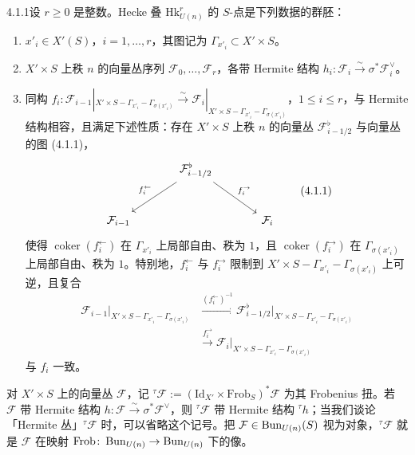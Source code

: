 \begin{defn}{4.1.1}设 $r\ge0$ 是整数。Hecke 叠 $\mathrm{Hk}^r_{U(n)}$ 的 $S$-点是下列数据的群胚：
\begin{enumerate}
\item $x'_i\in X'(S)$，$i=1,\dots,r$，其图记为 $\Gamma_{x'_i}\subset X'\times S$。
\item $X'\times S$ 上秩 $n$ 的向量丛序列 $\mathcal F_0,\dots,\mathcal F_r$，各带 Hermite 结构 $h_i\colon\mathcal F_i\xrightarrow{\sim}\sigma^*\mathcal F_i^\vee$。
\item 同构 $f_i\colon\mathcal F_{i-1}|_{X'\times S-\Gamma_{x'_i}-\Gamma_{\sigma(x'_i)}}\xrightarrow{\sim}\mathcal F_i|_{X'\times S-\Gamma_{x'_i}-\Gamma_{\sigma(x'_i)}}$，$1\le i\le r$，与 Hermite 结构相容，且满足下述性质：存在 $X'\times S$ 上秩 $n$ 的向量丛 $\mathcal F^\flat_{i-1/2}$ 与向量丛的图 (4.1.1)，
\begin{equation}
\begin{tikzcd}[column sep=large, row sep=large]
& \mathcal F^{\flat}_{i-1/2} \arrow[dl, "f_i^{\leftarrow}"'] \arrow[dr, "f_i^{\rightarrow}"] & \\
\mathcal F_{i-1} & & \mathcal F_i
\end{tikzcd}
\tag{4.1.1}\label{eq:a6-02-4-1-1}
\end{equation}
使得 $\operatorname{coker}(f_i^{\leftarrow})$ 在 $\Gamma_{x'_i}$ 上局部自由、秩为 $1$，且 $\operatorname{coker}(f_i^{\rightarrow})$ 在 $\Gamma_{\sigma(x'_i)}$ 上局部自由、秩为 $1$。特别地，$f_i^{\leftarrow}$ 与 $f_i^{\rightarrow}$ 限制到 $X'\times S-\Gamma_{x'_i}-\Gamma_{\sigma(x'_i)}$ 上可逆，且复合
\[
\begin{aligned}
\mathcal F_{i-1}|_{X'\times S-\Gamma_{x'_i}-\Gamma_{\sigma(x'_i)}}
&\xrightarrow{(f_i^{\leftarrow})^{-1}}
\mathcal F^{\flat}_{i-1/2}|_{X'\times S-\Gamma_{x'_i}-\Gamma_{\sigma(x'_i)}}\\
&\xrightarrow{f_i^{\rightarrow}}
\mathcal F_i|_{X'\times S-\Gamma_{x'_i}-\Gamma_{\sigma(x'_i)}}
\end{aligned}
\]
与 $f_i$ 一致。
\end{enumerate}
\end{defn}

对 $X'\times S$ 上的向量丛 $\mathcal F$，记 ${}^\tau\mathcal F:=(\mathrm{Id}_{X'}\times\mathrm{Frob}_S)^*\mathcal F$ 为其 Frobenius 扭。若 $\mathcal F$ 带 Hermite 结构 $h\colon\mathcal F\xrightarrow{\sim}\sigma^*\mathcal F^\vee$，则 ${}^\tau\mathcal F$ 带 Hermite 结构 ${}^\tau h$；当我们谈论「Hermite 丛」${}^\tau\mathcal F$ 时，可以省略这个记号。把 $\mathcal F\in\operatorname{Bun}_{U(n)}(S)$ 视为对象，${}^\tau\mathcal F$ 就是 $\mathcal F$ 在映射 $\mathrm{Frob}\colon\operatorname{Bun}_{U(n)}\to\operatorname{Bun}_{U(n)}$ 下的像。

